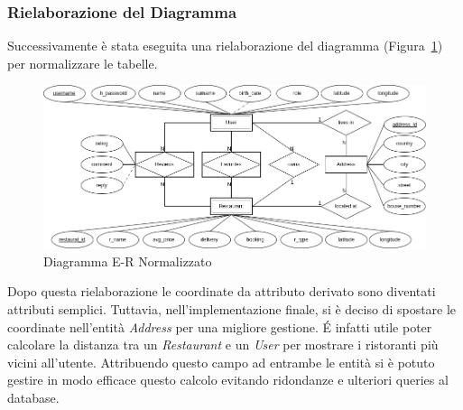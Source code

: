 \subsubsection{Rielaborazione del Diagramma}
Successivamente è stata eseguita una rielaborazione del diagramma 
(Figura~\ref{fig:er-diagram2})
per normalizzare le tabelle.
\begin{figure}[H]
  \centering
  \includegraphics[width=\textwidth]{images/ER-refactored.png}
  \caption{Diagramma E-R Normalizzato}
  \label{fig:er-diagram2}
\end{figure}
Dopo questa rielaborazione le coordinate da attributo derivato 
sono diventati attributi semplici.
Tuttavia, nell'implementazione finale, si è deciso di spostare le 
coordinate nell'entità \textit{Address} per una migliore gestione.
\'E infatti utile poter calcolare la distanza tra un \textit{Restaurant} 
e un \textit{User} per mostrare i ristoranti più vicini all'utente.
Attribuendo questo campo ad entrambe le entità si è potuto gestire 
in modo efficace questo calcolo evitando ridondanze e ulteriori 
queries al database.
